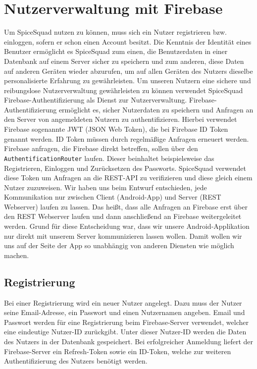 \documentclass{entwurfsheft}
\begin{document}
\newpage

\section{Nutzerverwaltung mit Firebase}\label{sec:Nutzerverwaltung}
Um SpiceSquad nutzen zu können, muss sich ein Nutzer registrieren bzw. einloggen, sofern er schon einen Account besitzt.
Die Kenntnis der Identität eines Benutzer ermöglicht es SpiceSquad zum einen, die Benutzerdaten in einer Datenbank auf einem Server sicher zu speichern und zum anderen, diese Daten auf anderen Geräten wieder abzurufen, um auf allen Geräten des Nutzers dieselbe personalisierte Erfahrung zu gewährleisten.
Um unseren Nutzern eine sichere und reibungslose Nutzerverwaltung gewährleisten zu können verwendet SpiceSquad Firebase-Authentifizierung als Dienst zur Nutzerverwaltung.
Firebase-Authentifizierung ermöglicht es, sicher Nutzerdaten zu speichern und Anfragen an den Server von angemeldeten Nutzern zu authentifizieren.
Hierbei verwendet Firebase sogenannte JWT (JSON Web Token), die bei Firebase ID Token genannt werden.
ID Token müssen durch regelmäßige Anfragen erneuert werden.
Firebase anfragen, die Firebase direkt betreffen, sollen über den \texttt{AuthentificationRouter} laufen.
Dieser beinhaltet beispielsweise das Registrieren, Einloggen und Zurücksetzen des Passworts.
SpiceSquad verwendet diese Token um Anfragen an die REST-API zu verifizieren und diese gleich einem Nutzer zuzuweisen.
Wir haben uns beim Entwurf entschieden, jede Kommunikation nur zwischen Client (Android-App) und Server (REST Webserver) laufen zu lassen. Das heißt, dass alle Anfragen an Firebase erst über den REST Webserver laufen und dann anschließend an Firebase weitergeleitet werden.
Grund für diese Entscheidung war, dass wir unsere Android-Applikation nur direkt mit unserem Server kommunizieren lassen wollen. Damit wollen wir uns auf der Seite der App so unabhängig von anderen Diensten wie möglich machen.

\subsection{Registrierung}
Bei einer Registrierung wird ein neuer Nutzer angelegt. Dazu muss der Nutzer seine Email-Adresse, ein Passwort und einen Nutzernamen angeben. Email und Passwort werden für eine Registrierung beim Firebase-Server verwendet, welcher eine eindeutige Nutzer-ID zurückgibt. Unter dieser Nutzer-ID werden die Daten des Nutzers in der Datenbank gespeichert. Bei erfolgreicher Anmeldung liefert der Firebase-Server ein Refresh-Token sowie ein ID-Token, welche zur weiteren Authentifizierung des Nutzers benötigt werden.
\end{document}
